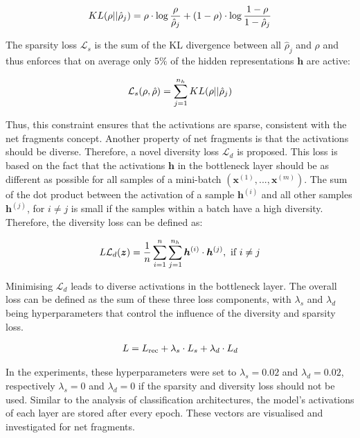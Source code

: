 \begin{align}\eqlbl{ae_kld}
		KL(\rho || \hat{\rho}_j) = \rho \cdot \log \frac{\rho}{\hat{\rho}_j} + (1-\rho) \cdot \log \frac{1-\rho}{1-\hat{\rho}_j}
\end{align}

The sparsity loss $\mathcal{L}_{s}$ is the sum of the KL divergence between all $\hat{\rho}_j$ and $\rho$ and thus enforces that on average only $5\%$ of the hidden representations $\boldsymbol{h}$ are active:

\begin{align}\eqlbl{ae_kldl}
		\mathcal{L}_{s}(\rho, \hat{\rho}) = \sum_{j=1}^{n_h} KL(\rho || \hat{\rho}_j)
\end{align}

Thus, this constraint ensures that the activations are sparse, consistent with the net fragments concept.
Another property of net fragments is that the activations should be diverse.
Therefore, a novel diversity loss $\mathcal{L}_{d}$ is proposed.
This loss is based on the fact that the activations $\boldsymbol{h}$ in the bottleneck layer should be as different as possible for all samples of a mini-batch $(\boldsymbol{x}^{(1)}, ..., \boldsymbol{x}^{(m)})$.
The sum of the dot product between the activation of a sample $\boldsymbol{h}^{(i)}$ and all other samples $\boldsymbol{h}^{(j)}$, for $i \neq j$ is small if the samples within a batch have a high diversity. Therefore, the diversity loss can be defined as:

\begin{align}\eqlbl{ae_kldl2}
		L\mathcal{L}_{d}(\boldsymbol{z}) = \frac{1}{n} \sum_{i=1}^n\sum_{j=1}^{n_h} \boldsymbol{h}^{(i)} \cdot \boldsymbol{h}^{(j)}, \text{ if } i\neq j
\end{align}

Minimising $\mathcal{L}_{d}$ leads to diverse activations in the bottleneck layer. 
The overall loss can be defined as the sum of these three loss components, with $\lambda_s$ and $\lambda_d$ being hyperparameters that control the influence of the diversity and sparsity loss.

\begin{align}\eqlbl{ae_kldl2}
		L = L_{\text{rec}} + \lambda_s \cdot L_{s} + \lambda_d \cdot L_{d}
\end{align}

In the experiments, these hyperparameters were set to $\lambda_s = 0.02$ and $\lambda_d = 0.02$, respectively $\lambda_s = 0$ and $\lambda_d = 0$ if the sparsity and diversity loss should not be used.
Similar to the analysis of classification architectures, the model's activations of each layer are stored after every epoch.
These vectors are visualised and investigated for net fragments.

